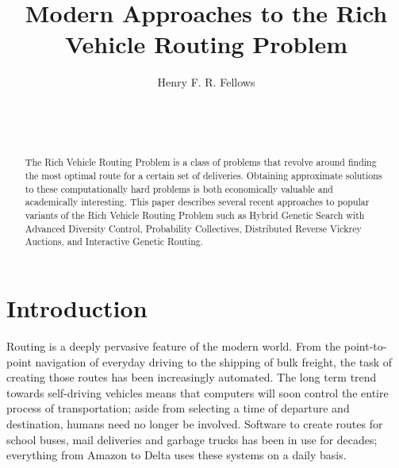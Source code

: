 \documentclass{sig-alternate}
\begin{document}

\title{Modern Approaches to the Rich Vehicle Routing Problem}


\author{
\alignauthor
Henry F. R. Fellows\\
	\\
	\\
	\\
}

\maketitle
\begin{abstract}

The Rich Vehicle Routing Problem is a class of problems that revolve around finding the most optimal route for a certain set of deliveries. Obtaining approximate solutions to these computationally hard problems is both economically valuable and academically interesting. This paper describes several recent approaches to popular variants of the Rich Vehicle Routing Problem such as Hybrid Genetic Search with Advanced Diversity Control, Probability Collectives, Distributed Reverse Vickrey Auctions, and Interactive Genetic Routing.
\end{abstract}


\section{Introduction}
\label{sec:intro}
Routing is a deeply pervasive feature of the modern world. From the point-to-point navigation of everyday driving to the shipping of bulk freight, the task of creating those routes has been increasingly automated. The long term trend towards self-driving vehicles means that computers will soon control the entire process of transportation; aside from selecting a time of departure and destination, humans need no longer be involved. Software to create routes for school buses, mail deliveries and garbage trucks has been in use for decades; everything from Amazon to Delta uses these systems on a daily basis. 
\end{document}
